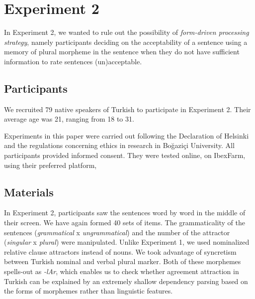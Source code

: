 \documentclass[doc,a4paper,man,natbib,floatsintext,noextraspace]{apa6}\usepackage[]{graphicx}\usepackage[]{color}
\begin{document}
\section{Experiment 2} \label{sec:exp2}







In Experiment 2, we wanted to rule out the possibility of \textit{form-driven processing strategy}, namely participants deciding on the acceptability of a sentence using a memory of plural morpheme in the sentence when they do not have sufficient information to rate sentences (un)acceptable. 
 

\subsection{Participants} \label{sec:exp2:participants}

We recruited 79 native speakers of Turkish to participate in Experiment 2. Their average age was 21, ranging from 18 to 31. 


Experiments in this paper were carried out following the Declaration of Helsinki and the regulations concerning ethics in research in Bo\u{g}azi\c{c}i University. All participants provided informed consent. They were tested online, on IbexFarm, using their preferred platform, %


\subsection{Materials} \label{sec:exp2:materials}

In Experiment 2, participants saw the sentences word by word in the middle of their screen. We have again formed 40 sets of items. The grammaticality of the sentences (\textit{grammatical} x \textit{ungrammatical}) and the number of the attractor (\textit{singular} x \textit{plural}) were manipulated. Unlike Experiment 1, we used nominalized relative clause attractors instead of nouns. We took advantage of syncretism between Turkish nominal and verbal plural marker. Both of these morphemes spells-out as \textit{-lAr}, which enables us to check whether agreement attraction in Turkish can be explained by an extremely shallow dependency parsing based on the forms of morphemes rather than linguistic features.
\end{document}
